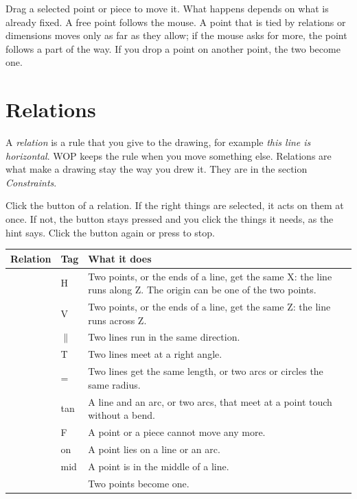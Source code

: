 Drag a selected point or piece to move it. What happens depends on what is already fixed. A free point follows the mouse. A point that is tied by relations or dimensions moves only as far as they allow; if the mouse asks for more, the point follows a part of the way. If you drop a point on another point, the two become one.

\section{Relations}\label{sec:sketch:relations}

A \emph{relation} is a rule that you give to the drawing, for example \emph{this line is horizontal}. WOP keeps the rule when you move something else. Relations are what make a drawing stay the way you drew it. They are in the section \emph{Constraints}.

Click the button of a relation. If the right things are selected, it acts on them at once. If not, the button stays pressed and you click the things it needs, as the hint says. Click the button again or press  to stop.

\begin{center}
\begin{tabularx}{\textwidth}{@{}l l Y@{}}
\toprule
\textbf{Relation} & \textbf{Tag} & \textbf{What it does} \\
\midrule
{} & H & Two points, or the ends of a line, get the same X: the line runs along Z. The origin can be one of the two points. \\
 & V & Two points, or the ends of a line, get the same Z: the line runs across Z. \\
 & $\parallel$ & Two lines run in the same direction. \\
 & T & Two lines meet at a right angle. \\
 & = & Two lines get the same length, or two arcs or circles the same radius. \\
 & tan & A line and an arc, or two arcs, that meet at a point touch without a bend. \\
 & F & A point or a piece cannot move any more. \\
 & on & A point lies on a line or an arc. \\
 & mid & A point is in the middle of a line. \\
 & & Two points become one. \\
\bottomrule
\end{tabularx}
\end{center}

